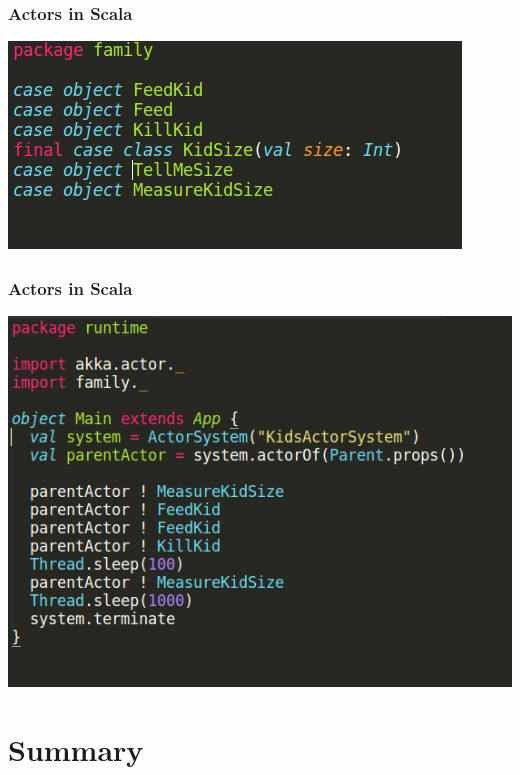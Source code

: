 \documentclass{beamer}
\begin{document}

\begin{frame}
\frametitle{Actors in Scala}
\includegraphics[width=1\linewidth]{./images/parent_messages.png}
\end{frame}


\begin{frame}
\frametitle{Actors in Scala}
\includegraphics[width=0.8\linewidth]{./images/parent_main.png}
\end{frame}


\section{Summary}

\end{document}

